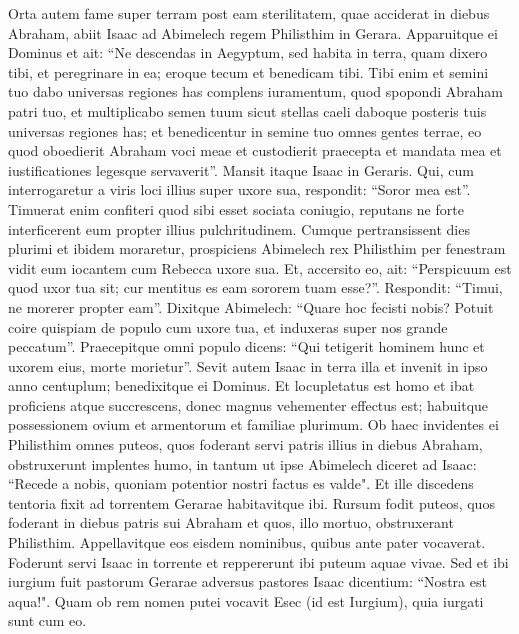 \begin{biblechapter}  
\verse Orta autem fame super terram post eam sterilitatem, quae acciderat in diebus Abraham, abiit Isaac ad Abimelech regem Philisthim in Gerara. 
\verse Apparuitque ei Dominus et ait: “Ne descendas in Aegyptum, sed habita in terra, quam dixero tibi, 
\verse et peregrinare in ea; eroque tecum et benedicam tibi. Tibi enim et semini tuo dabo universas regiones has complens iuramentum, quod spopondi Abraham patri tuo, 
\verse et multiplicabo semen tuum sicut stellas caeli daboque posteris tuis universas regiones has; et benedicentur in semine tuo omnes gentes terrae, 
\verse eo quod oboedierit Abraham voci meae et custodierit praecepta et mandata mea et iustificationes legesque servaverit”. 
\verse Mansit itaque Isaac in Geraris. 
\verse Qui, cum interrogaretur a viris loci illius super uxore sua, respondit: “Soror mea est”. Timuerat enim confiteri quod sibi esset sociata coniugio, reputans ne forte interficerent eum propter illius pulchritudinem. 
\verse Cumque pertransissent dies plurimi et ibidem moraretur, prospiciens Abimelech rex Philisthim per fenestram vidit eum iocantem cum Rebecca uxore sua. 
\verse Et, accersito eo, ait: “Perspicuum est quod uxor tua sit; cur mentitus es eam sororem tuam esse?”. Respondit: “Timui, ne morerer propter eam”. 
\verse Dixitque Abimelech: “Quare hoc fecisti nobis? Potuit coire quispiam de populo cum uxore tua, et induxeras super nos grande peccatum”. Praecepitque omni populo dicens:  
\verse “Qui tetigerit hominem hunc et uxorem eius, morte morietur”. 
\verse Sevit autem Isaac in terra illa et invenit in ipso anno centuplum; benedixitque ei Dominus. 
\verse Et locupletatus est homo et ibat proficiens atque succrescens, donec magnus vehementer effectus est; 
\verse habuitque possessionem ovium et armentorum et familiae plurimum. Ob haec invidentes ei Philisthim 
\verse omnes puteos, quos foderant servi patris illius in diebus Abraham, obstruxerunt implentes humo, 
\verse in tantum ut ipse Abimelech diceret ad Isaac: “Recede a nobis, quoniam potentior nostri factus es valde". 
\verse Et ille discedens tentoria fixit ad torrentem Gerarae habitavitque ibi.  
\verse Rursum fodit puteos, quos foderant in diebus patris sui Abraham et quos, illo mortuo, obstruxerant Philisthim. Appellavitque eos eisdem nominibus, quibus ante pater vocaverat. 
\verse Foderunt servi Isaac in torrente et reppererunt ibi puteum aquae vivae. 
\verse Sed et ibi iurgium fuit pastorum Gerarae adversus pastores Isaac dicentium: “Nostra est aqua!". Quam ob rem nomen putei vocavit Esec (id est Iurgium), quia iurgati sunt cum eo. 

\end{biblechapter}
